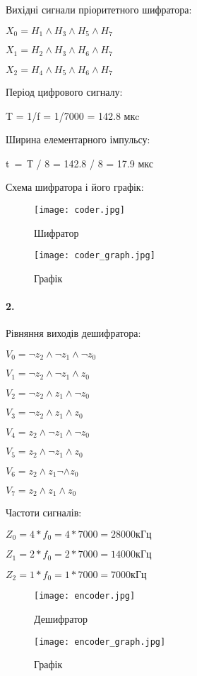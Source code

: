 \documentclass[12pt]{extarticle}
\begin{document}
\vspace{12pt}
Вихідні сигнали пріоритетного шифратора:

$X_0=H_1 \land H_3 \land H_5 \land H_7 $

$X_1=H_2 \land H_3 \land H_6 \land H_7  $

$X_2=H_4 \land H_5 \land H_6 \land H_7 $

\vspace{12pt}
Період цифрового сигналу:

T = 1/f = 1/7000 = 142.8 мкc

\vspace{12pt}
Ширина елементарного імпульсу:

t = Т / 8 = 142.8 / 8 = 17.9 мкс

\vspace{12pt}
Схема шифратора і його графік:
\begin{figure}[H]
    \centering
    \texttt{[image: coder.jpg]}
    \caption{Шифратор}
\end{figure}
\begin{figure}[H]
    \centering
    \texttt{[image: coder\_graph.jpg]}
    \caption{Графік}
\end{figure}

\paragraph{2.}

Рівняння виходів дешифратора:

$V_0 = \neg z_2 \land \neg z_1 \land \neg z_0$

$V_1 = \neg z_2 \land \neg z_1 \land z_0$

$V_2 = \neg z_2 \land z_1 \land \neg z_0$

$V_3 = \neg z_2 \land z_1 \land z_0$

$V_4 = z_2 \land \neg z_1 \land \neg z_0$

$V_5 = z_2 \land \neg z_1 \land z_0$

$V_6 = z_2 \land z_1 \neg \land z_0$

$V_7 = z_2 \land z_1 \land z_0$

\vspace{12pt}
Частоти сигналів:

$Z_0 = 4*f_0 = 4*7000=28000 кГц $

$Z_1 = 2*f_0 = 2*7000=14000 кГц $

$Z_2 = 1*f_0 = 1*7000=7000 кГц $

\begin{figure}[H]
    \centering
    \texttt{[image: encoder.jpg]}
    \caption{Дешифратор}
\end{figure}
\begin{figure}[H]
    \centering
    \texttt{[image: encoder\_graph.jpg]}
    \caption{Графік}
\end{figure}
\end{document}

